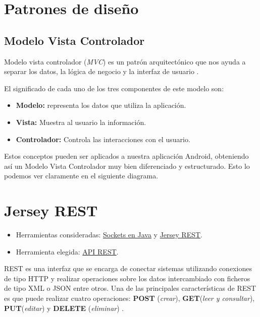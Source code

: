 
\section{Patrones de diseño}
\subsection{Modelo Vista Controlador}

Modelo vista controlador (\emph{MVC}) es un patrón arquitectónico que nos ayuda a separar los datos, la lógica de negocio y la interfaz de usuario \cite{mvc:wiki}.


El significado de cada uno de los tres componentes de este modelo son:

\begin{itemize}
	\tightlist
	\item
	\textbf{Modelo:} representa los datos que utiliza la aplicación.
	\item
	\textbf{Vista:} Muestra al usuario la información.
	\item
	\textbf{Controlador:} Controla las interacciones con el usuario.
\end{itemize}


Estos conceptos pueden ser aplicados a nuestra aplicación Android, obteniendo así un Modelo Vista Controlador muy bien diferenciado y estructurado. Esto lo podemos ver claramente en el siguiente diagrama.

\section{Jersey REST}

\begin{itemize}
	\tightlist
	\item
	Herramientas consideradas: \href{https://www.programarya.com/Cursos-Avanzados/Java/Sockets}{Sockets en Java} y \href{https://jersey.github.io/}{Jersey REST}.
	\item
	Herramienta elegida: \href{https://jersey.github.io/}{API REST}.
\end{itemize}

REST es una interfaz que se encarga de conectar sistemas utilizando conexiones de tipo HTTP y realizar operaciones sobre los datos intercambiado con ficheros de tipo XML o JSON entre otros. Una de las principales características de REST es que puede realizar cuatro operaciones: \textbf{POST} (\textit{crear}), \textbf{GET}(\textit{leer y consultar}), \textbf{PUT}(\textit{editar}) y \textbf{DELETE} (\textit{eliminar}) \cite{rest:info}.

